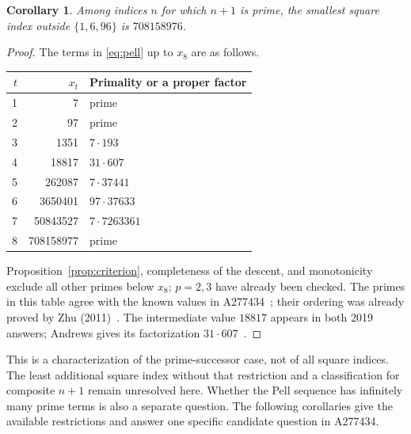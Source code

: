 \documentclass[11pt]{article}
\newtheorem{corollary}[theorem]{Corollary}
\begin{document}
\begin{corollary}\label{cor:minimal}
Among indices $n$ for which $n+1$ is prime, the smallest square
index outside $\{1,6,96\}$ is $708158976$.
\end{corollary}
\begin{proof}
The terms in \eqref{eq:pell} up to $x_8$ are as follows.
\begin{center}
\begin{tabular}{rrl}
\toprule
$t$ & $x_t$ & Primality or a proper factor\\
\midrule
1 & 7 & prime\\
2 & 97 & prime\\
3 & 1351 & $7\cdot193$\\
4 & 18817 & $31\cdot607$\\
5 & 262087 & $7\cdot37441$\\
6 & 3650401 & $97\cdot37633$\\
7 & 50843527 & $7\cdot7263361$\\
8 & 708158977 & prime\\
\bottomrule
\end{tabular}
\end{center}
Proposition~\ref{prop:criterion}, completeness of the descent, and
monotonicity exclude all other primes below $x_8$; $p=2,3$ have
already been checked. The primes in this table agree with the
known values in A277434~\cite{tiffin}; their ordering was already proved
by Zhu (2011)~\cite[p.~200]{zhu}. The intermediate value
$18817$ appears in both 2019 answers; Andrews gives its
factorization $31\cdot607$~\cite{tanner,andrews}.
\end{proof}

This is a characterization of the prime-successor case, not of all
square indices. The least additional square index without that
restriction and a classification for composite $n+1$ remain unresolved
here. Whether the Pell sequence has infinitely many prime terms is
also a separate question. The following corollaries give the available
restrictions and answer one specific candidate question in A277434.
\end{document}
